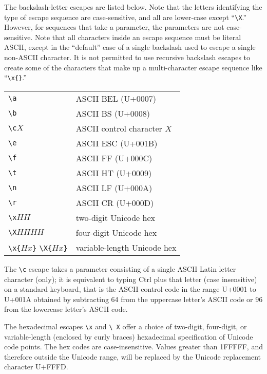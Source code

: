 \documentclass[twocolumn]{report}
\begin{document}
The backslash-letter escapes are listed below.  Note that the letters
identifying the type of escape sequence are case-sensitive, and all are
lower-case except ``\texttt{\textbackslash X}.''  However, for sequences
that take a parameter, the parameters are not case-sensitive.  Note that all
characters inside an escape sequence must be literal ASCII, except in the
``default'' case of a single backslash used to escape a single non-ASCII
character.  It is not permitted to use recursive backslash escapes to create
some of the characters that make up a multi-character escape sequence like
``\texttt{\textbackslash x\{\}}.''

\hspace*{\fill}
\begin{tabular}{ll}
  \texttt{\textbackslash a} & ASCII BEL (U+0007) \\
  \texttt{\textbackslash b} & ASCII BS (U+0008) \\
  \texttt{\textbackslash c}$X$ & ASCII control character $X$ \\
  \texttt{\textbackslash e} & ASCII ESC (U+001B) \\
  \texttt{\textbackslash f} & ASCII FF (U+000C) \\
  \texttt{\textbackslash t} & ASCII HT (U+0009) \\
  \texttt{\textbackslash n} & ASCII LF (U+000A) \\
  \texttt{\textbackslash r} & ASCII CR (U+000D) \\
  \texttt{\textbackslash x}$HH$ & two-digit Unicode hex \\
  \texttt{\textbackslash X}$HHHH$ & four-digit Unicode hex \\
  \texttt{\textbackslash x\{}$Hx$\texttt{\}}
    \texttt{\textbackslash X\{}$Hx$\texttt{\}} &
    variable-length Unicode hex
\end{tabular}
\hspace*{\fill}\par

The \texttt{\textbackslash c} escape takes a parameter consisting of a
single ASCII Latin letter character (only); it is equivalent to typing Ctrl
plus that letter (case insensitive) on a standard keyboard, that is the
ASCII control code in the range U+0001 to U+001A obtained by subtracting 64
from the uppercase letter's ASCII code or 96 from the lowercase letter's
ASCII code.

The hexadecimal escapes \texttt{\textbackslash x} and \texttt{\textbackslash
X} offer a choice of two-digit, four-digit, or variable-length (enclosed by
curly braces) hexadecimal specification of Unicode code points.  The hex
codes are case-insensitive.  Values greater than 1FFFFF, and therefore
outside the Unicode range, will be replaced by the Unicode replacement
character U+FFFD.
\end{document}
